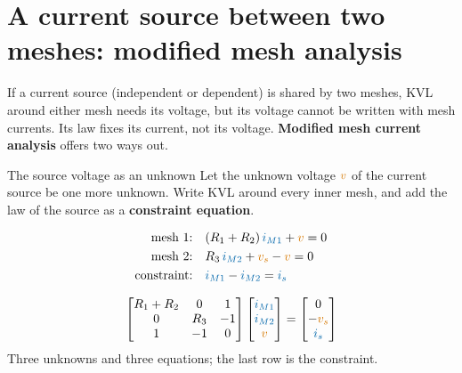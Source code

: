 \documentclass[11pt,a4paper]{article}
\newcommand{\Icol}[1]{\textcolor{ccur}{#1}}
\newcommand{\Vcol}[1]{\textcolor{cvolt}{#1}}
\newcommand{\im}[1]{\textcolor{ccur}{i_{M#1}}}
\newcommand{\meshcw}[4][0.36]{%
  \draw[ccur, thick, -{Stealth[length=2mm]}] ($(#2,#3)+(150:#1)$)
    arc[start angle=150, end angle=-150, radius=#1];
  \node[mlabst] at (#2,#3) {#4};}
\newcommand{\exN}[2]{%
  \draw (0,0) to[R, l=$R_1$] (0,2.2) to[R, l=$R_2$] (3,2.2) to[R, l=$R_3$] (6,2.2);
  \draw (3,2.2) to[american current source, l=$\Icol{i_s}$] (3,0);
  \ifnum#1=0
    \draw (6,2.2) to[american voltage source, l=$\Vcol{v_s}$] (6,0);
  \else
    \draw (6,2.2) to[american controlled voltage source, l=$\Vcol{r_m i_x}$] (6,0);
    \draw[iar] (-0.28,1.62) -- (-0.28,2.12); \node[font=\small, text=ccur] at (-0.58,1.9) {$i_x$};
  \fi
  \draw (0,0) -- (6,0);
  \foreach \p in {(3,2.2),(3,0)} \fill \p circle (1.7pt);
  \ifnum#2>0 \meshcw{1.45}{1.1}{1} \meshcw{4.75}{1.1}{2} \fi
  \ifnum#2=2
    \draw[smesh] (0,0) -- (0,2.2) -- (6,2.2) -- (6,0) -- cycle;
    \node[nlab] at (0.55,0.38) {S};
  \fi
  \ifnum#2=3
    \node[pol] at (2.62,1.75) {$+$}; \node[pol] at (2.62,0.45) {$-$};
    \node[font=\small, text=cvolt] at (2.45,1.1) {$v$};
  \fi}
\begin{document}
\section{A current source between two meshes: modified mesh analysis}

If a current source (independent or dependent) is shared by two meshes, KVL around either mesh
needs its voltage, but its voltage cannot be written with mesh currents. Its law fixes its
current, not its voltage. \textbf{Modified mesh current analysis} offers two ways out.

\begin{definitionbox}{The source voltage as an unknown}
Let the unknown voltage $\Vcol{v}$ of the current source be one more unknown. Write KVL around
every inner mesh, and add the law of the source as a \textbf{constraint equation}.
\end{definitionbox}

\begin{examplebox}
\begin{minipage}[c]{0.4\linewidth}
\centering
{}
\end{minipage}\hfill
\begin{minipage}[c]{0.58\linewidth}
\begin{align*}
  \text{mesh 1:}\quad & (R_1 + R_2)\,\im{1} + \Vcol{v} = 0\\
  \text{mesh 2:}\quad & R_3\,\im{2} + \Vcol{v_s} - \Vcol{v} = 0\\
  \text{constraint:}\quad & \im{1} - \im{2} = \Icol{i_s}
\end{align*}
\end{minipage}
\[
  \begin{bmatrix}
    R_1 + R_2 & 0 & 1\\ 0 & R_3 & -1\\ 1 & -1 & 0
  \end{bmatrix}
  \begin{bmatrix} \im{1}\\ \im{2}\\ \Vcol{v} \end{bmatrix}
  = \begin{bmatrix} 0\\ -\Vcol{v_s}\\ \Icol{i_s} \end{bmatrix}
\]
Three unknowns and three equations; the last row is the constraint.
\end{examplebox}
\end{document}

